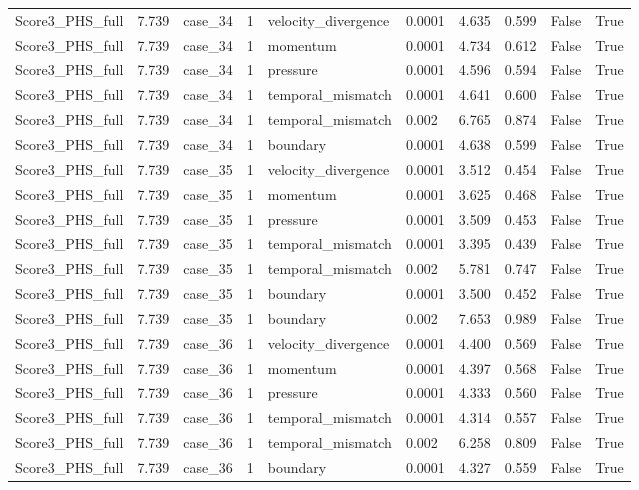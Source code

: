 \begin{longtable}{llllllllll}
Score3\_PHS\_full & 7.739 & case\_34 & 1 & velocity\_divergence & 0.0001 & 4.635 & 0.599 & False & True \\
Score3\_PHS\_full & 7.739 & case\_34 & 1 & momentum & 0.0001 & 4.734 & 0.612 & False & True \\
Score3\_PHS\_full & 7.739 & case\_34 & 1 & pressure & 0.0001 & 4.596 & 0.594 & False & True \\
Score3\_PHS\_full & 7.739 & case\_34 & 1 & temporal\_mismatch & 0.0001 & 4.641 & 0.600 & False & True \\
Score3\_PHS\_full & 7.739 & case\_34 & 1 & temporal\_mismatch & 0.002 & 6.765 & 0.874 & False & True \\
Score3\_PHS\_full & 7.739 & case\_34 & 1 & boundary & 0.0001 & 4.638 & 0.599 & False & True \\
Score3\_PHS\_full & 7.739 & case\_35 & 1 & velocity\_divergence & 0.0001 & 3.512 & 0.454 & False & True \\
Score3\_PHS\_full & 7.739 & case\_35 & 1 & momentum & 0.0001 & 3.625 & 0.468 & False & True \\
Score3\_PHS\_full & 7.739 & case\_35 & 1 & pressure & 0.0001 & 3.509 & 0.453 & False & True \\
Score3\_PHS\_full & 7.739 & case\_35 & 1 & temporal\_mismatch & 0.0001 & 3.395 & 0.439 & False & True \\
Score3\_PHS\_full & 7.739 & case\_35 & 1 & temporal\_mismatch & 0.002 & 5.781 & 0.747 & False & True \\
Score3\_PHS\_full & 7.739 & case\_35 & 1 & boundary & 0.0001 & 3.500 & 0.452 & False & True \\
Score3\_PHS\_full & 7.739 & case\_35 & 1 & boundary & 0.002 & 7.653 & 0.989 & False & True \\
Score3\_PHS\_full & 7.739 & case\_36 & 1 & velocity\_divergence & 0.0001 & 4.400 & 0.569 & False & True \\
Score3\_PHS\_full & 7.739 & case\_36 & 1 & momentum & 0.0001 & 4.397 & 0.568 & False & True \\
Score3\_PHS\_full & 7.739 & case\_36 & 1 & pressure & 0.0001 & 4.333 & 0.560 & False & True \\
Score3\_PHS\_full & 7.739 & case\_36 & 1 & temporal\_mismatch & 0.0001 & 4.314 & 0.557 & False & True \\
Score3\_PHS\_full & 7.739 & case\_36 & 1 & temporal\_mismatch & 0.002 & 6.258 & 0.809 & False & True \\
Score3\_PHS\_full & 7.739 & case\_36 & 1 & boundary & 0.0001 & 4.327 & 0.559 & False & True \\

\end{longtable}

